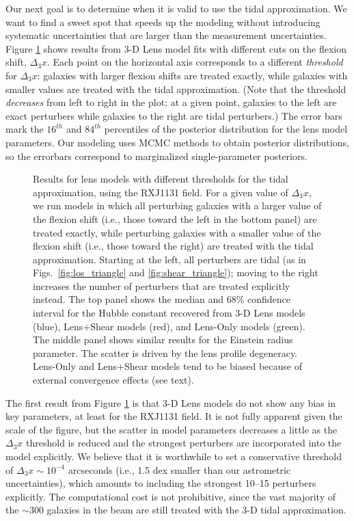\documentclass{emulateapj}
\begin{document}
Our next goal is to determine when it is valid to use the tidal approximation.  We want to find a sweet spot that speeds up the modeling without introducing systematic uncertainties that are larger than the measurement uncertainties.  Figure \ref{fig:RXJ1131} shows results from 3-D Lens model fits with different cuts on the flexion shift, $\Delta_3 x$.  Each point on the horizontal axis corresponds to a different \emph{threshold} for $\Delta_3 x$: galaxies with larger flexion shifts are treated exactly, while galaxies with smaller values are treated with the tidal approximation.  (Note that the threshold \emph{decreases} from left to right in the plot; at a given point, galaxies to the left are exact perturbers while galaxies to the right are tidal perturbers.)  The error bars mark the $16^{th}$ and $84^{th}$ percentiles of the posterior distribution for the lens model parameters.  Our modeling uses MCMC methods to obtain posterior distributions, so the errorbars correspond to marginalized single-parameter posteriors.

\begin{figure}[t]
\begin{center}
\caption{\label{fig:RXJ1131} Results for lens models with different thresholds for the tidal approximation, using the RXJ1131 field.  For a given value of $\Delta_3 x$, we run models in which all perturbing galaxies with a larger value of the flexion shift (i.e., those toward the left in the bottom panel) are treated exactly, while perturbing galaxies with a smaller value of the flexion shift (i.e., those toward the right) are treated with the tidal approximation.  Starting at the left, all perturbers are tidal (as in Figs.\ \ref{fig:los_triangle} and \ref{fig:shear_triangle}); moving to the right increases the number of perturbers that are treated explicitly instead.  The top panel shows the median and 68\% confidence interval for the Hubble constant recovered from 3-D Lens models (blue), Lens+Shear models (red), and Lens-Only models (green).  The middle panel shows similar results for the Einstein radius parameter.  The scatter is driven by the lens profile degeneracy.  Lens-Only and Lens+Shear models tend to be biased because of external convergence effects (see text).%
}
\end{center}
\end{figure}

The first result from Figure \ref{fig:RXJ1131} is that 3-D Lens models do not show any bias in key parameters, at least for the RXJ1131 field.  It is not fully apparent given the scale of the figure, but the scatter in model parameters decreases a little as the $\Delta_3 x$ threshold is reduced and the strongest perturbers are incorporated into the model explicitly.  We believe that it is worthwhile to set a conservative threshold of $\Delta_3 x \sim 10^{-4}$ arcseconds (i.e., 1.5 dex smaller than our astrometric uncertainties), which amounts to including the strongest 10--15 perturbers explicitly.  The computational cost is not prohibitive, since the vast majority of the $\sim 300$ galaxies in the beam are still treated with the 3-D tidal approximation.
\end{document}
